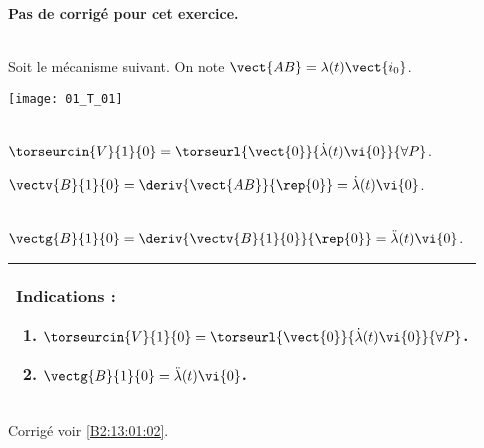 \normaltrue
\correctiontrue


\setcounter{numques}{0}
\ifcorrection
\else
\textbf{Pas de corrigé pour cet exercice.}
\fi

\ifprof
\else ~\\
Soit le mécanisme suivant. On note $\vect{AB}=\lambda(t)\vect{i_0}$.
\begin{center}
\texttt{[image: 01\_T\_01]}
\end{center}
\fi

\ifprof ~\\
$\torseurcin{V}{1}{0} = \torseurl{\vect{0}}{\dot{\lambda}(t)\vi{0}}{\forall P}$.

$\vectv{B}{1}{0} = \deriv{\vect{AB}}{\rep{0}}=\dot{\lambda}(t)\vi{0}$.
\else
\fi

\ifprof  ~\\
 $\vectg{B}{1}{0} = \deriv{\vectv{B}{1}{0}}{\rep{0}}=\ddot{\lambda}(t)\vi{0}$.
\else
\fi


\ifprof
\else
\footnotesize
\begin{center}
\begin{tabular}{|p{.9\linewidth}|}
\hline
Indications :
\begin{enumerate}
\item $\torseurcin{V}{1}{0} = \torseurl{\vect{0}}{\dot{\lambda}(t)\vi{0}}{\forall P}$.
\item  $\vectg{B}{1}{0} =\ddot{\lambda}(t)\vi{0}$.
\end{enumerate} \\ \hline
\end{tabular}
\end{center}
\normalsize

\begin{flushright}
\footnotesize{Corrigé  voir \ref{B2:13:01:02}.}
\end{flushright}%
\fi


